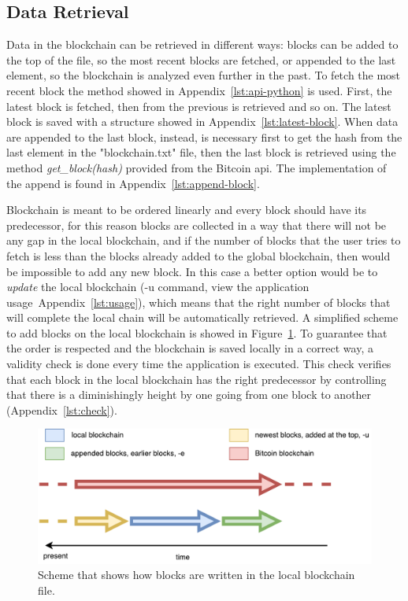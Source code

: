 \documentclass[USenglish]{uit-thesis}
\begin{document}
\subsection{Data Retrieval}
\label{sec:data_retrieval}
Data in the blockchain can be retrieved in different ways: blocks can be added to
the top of the file, so the most recent blocks are fetched, or appended to the last element,
so the blockchain is analyzed even further in the past.
To fetch the most recent block the method showed in Appendix~\ref{lst:api-python}
is used. First, the latest block is fetched, then from the previous is retrieved and so on.
The latest block is saved with a structure showed in Appendix~\ref{lst:latest-block}.
When data are appended to the last block, instead, is necessary first to get the hash
from the last element in the "blockchain.txt" file, then the last block is retrieved
using the method \emph{get\_block(hash)} provided from the Bitcoin \gls{api}.
The implementation of the append is found in Appendix~\ref{lst:append-block}.

Blockchain is meant to be ordered linearly and every block should have its predecessor,
for this reason blocks are collected in a way that there will not be any gap in the local blockchain, and
if the number of blocks that the user tries to fetch is less than the blocks
already added to the global blockchain, then would be impossible to add any new block.
In this case a better option would be to \emph{update} the local blockchain (-u command, view the application
usage~Appendix~\ref{lst:usage}), which means that the right number of blocks that will complete
the local chain will be automatically retrieved. A simplified scheme to add blocks on
the local blockchain is showed in Figure~\ref{fig:blockchain-scheme}. To guarantee that the order is
respected and the blockchain is saved locally in a correct way, a validity check is done every time
the application is executed. This check verifies that
each block in the local blockchain has the right predecessor by controlling that there is a
diminishingly height by one going from one block to another (Appendix~\ref{lst:check}).
\begin{figure}[h!]
	\centering
	\includegraphics[width=1\textwidth]{img/blockchain-scheme}
	\caption{Scheme that shows how blocks are written in the local blockchain file.}
	\label{fig:blockchain-scheme}
\end{figure}
\end{document}
